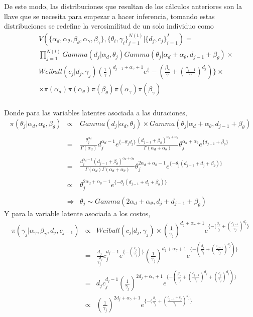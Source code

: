 De este modo, las distribuciones que resultan de los c\'alculos anteriores son la llave que se necesita para empezar a hacer inferencia, tomando estas distribuciones se redefine la verosimilitud de un solo individuo como
\begin{eqnarray*}
&&V(\{\alpha_d,\alpha_\theta,\beta_\theta,\alpha_\gamma,\beta_\gamma\},\{\theta_i,\gamma_i\}_{j=1}^{N(t)}|\{d_j,c_j\}_{i=1}^I)=\\ 
&&\prod_{j=1}^{N(t)} Gamma(d_j|\alpha_d,\theta_j) Gamma(\theta_j|\alpha_d+\alpha_\theta,d_{j-1}+\beta_\theta)\times \\
&&Weibull(c_j|d_j,\gamma_j)(\frac{1}{\gamma})^{d_{j-1}+\alpha_\gamma+1}e^\{-(\frac{\beta_\gamma}{\gamma}+(\frac{c_{j-1}}{\gamma})^{d_j})\} \times \\
&&\times \pi(\alpha_d)\pi(\alpha_\theta)\pi(\beta_\theta)\pi(\alpha_\gamma)\pi(\beta_\gamma)
\end{eqnarray*}
\\
Donde para las variables latentes asociada a las duraciones,
\begin{eqnarray*}
\pi(\theta_j|\alpha_d,\alpha_\theta,\beta_\theta)&\propto& Gamma(d_j|\alpha_d,\theta_j)\times Gamma(\theta_j|\alpha_d+\alpha_\theta,d_{j-1}+\beta_\theta)\\
\\
&=&\frac{\theta_j^{\alpha_d}}{\Gamma(\alpha_d)} d_j^{\alpha_d-1} e^{\{-\theta_jd_j\}}\frac{(d_{j-1}+\beta_\theta)^{\alpha_d+\alpha_\theta}}{\Gamma(\alpha_d+\alpha_\theta)}\theta_j^{\alpha_d+\alpha_\theta}e^{\{d_{j-1}+\beta_\theta\}}\\
\\
&=&\frac{d_j^{\alpha_d-1}(d_{j-1}+\beta_\theta)^{\alpha_d+\alpha_\theta}}{\Gamma(\alpha_d)\Gamma(\alpha_d+\alpha_\theta)} \theta_j^{2\alpha_d+\alpha_\theta-1}e^{\{-\theta_j(d_{j-1}+d_j+\beta_\theta)\}}\\
\\
&\propto& \theta_j^{2\alpha_d+\alpha_\theta-1}e^{\{-\theta_j(d_{j-1}+d_j+\beta_\theta)\}}\\
\\
&\Rightarrow& \theta_j \sim Gamma(2\alpha_d+\alpha_\theta,d_j+d_{j-1}+\beta_\theta)
\end{eqnarray*}
Y para la variable latente asociada a los costos,
\begin{eqnarray*}
\pi(\gamma_j|\alpha_\gamma,\beta_\gamma,d_j,c_{j-1})&\propto& Weibull(c_j|d_j,\gamma_j)\times (\frac{1}{\gamma_j})^{d_j +\alpha_\gamma+1}e^{\{-(\frac{\beta_\gamma}{\gamma_j}+(\frac{c_{j-1}}{\gamma_j})^{d_j}\}}\\
&=&\frac{d_j}{\gamma_j^{d_j}}c_j^{d_j-1}e^{\{-(\frac{c_j}{\gamma_j})\}}(\frac{1}{\gamma_j})^{d_j+\alpha_\gamma+1}e^{\{-(\frac{\beta_\gamma}{\gamma_j}+(\frac{c_{j-1}}{\gamma_j})^{d_j})\}}\\
&=&d_j c_j^{d_j-1}(\frac{1}{\gamma_j})^{2d_j+\alpha_\gamma+1}e^{\{-(\frac{\beta_\gamma}{\gamma_j}+(\frac{c_{j-1}}{\gamma_j})^{d_j}+(\frac{c_j}{\gamma_j})^{d_j})\}}\\
&\propto&(\frac{1}{\gamma_j})^{2d_j+\alpha_\gamma+1}e^{\{-(\frac{\beta_\gamma}{\gamma_j}+(\frac{c_{j-1}+c_j}{\gamma_j})^{d_j}\}}
\end{eqnarray*}
